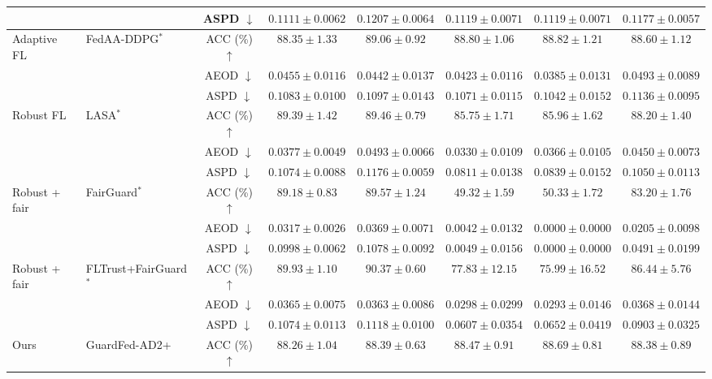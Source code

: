 \begin{table}[t]
{\begin{tabular}{l|l|c|ccccc}
 &  & ASPD $\downarrow$ & $0.1111 \pm 0.0062$ & $0.1207 \pm 0.0064$ & $0.1119 \pm 0.0071$ & $0.1119 \pm 0.0071$ & $0.1177 \pm 0.0057$ \\
\hline
\multirow{3}{*}{Adaptive FL} & \multirow{3}{*}{FedAA-DDPG$^{*}$} & ACC (\%) $\uparrow$ & $88.35 \pm 1.33$ & $89.06 \pm 0.92$ & $88.80 \pm 1.06$ & $88.82 \pm 1.21$ & $88.60 \pm 1.12$ \\
 &  & AEOD $\downarrow$ & $0.0455 \pm 0.0116$ & $0.0442 \pm 0.0137$ & $0.0423 \pm 0.0116$ & $0.0385 \pm 0.0131$ & $0.0493 \pm 0.0089$ \\
 &  & ASPD $\downarrow$ & $0.1083 \pm 0.0100$ & $0.1097 \pm 0.0143$ & $0.1071 \pm 0.0115$ & $0.1042 \pm 0.0152$ & $0.1136 \pm 0.0095$ \\
\hline
\multirow{3}{*}{Robust FL} & \multirow{3}{*}{LASA$^{*}$} & ACC (\%) $\uparrow$ & $89.39 \pm 1.42$ & $89.46 \pm 0.79$ & $85.75 \pm 1.71$ & $85.96 \pm 1.62$ & $88.20 \pm 1.40$ \\
 &  & AEOD $\downarrow$ & $0.0377 \pm 0.0049$ & $0.0493 \pm 0.0066$ & $0.0330 \pm 0.0109$ & $0.0366 \pm 0.0105$ & $0.0450 \pm 0.0073$ \\
 &  & ASPD $\downarrow$ & $0.1074 \pm 0.0088$ & $0.1176 \pm 0.0059$ & $0.0811 \pm 0.0138$ & $0.0839 \pm 0.0152$ & $0.1050 \pm 0.0113$ \\
\hline
\multirow{3}{*}{Robust + fair} & \multirow{3}{*}{FairGuard$^{*}$} & ACC (\%) $\uparrow$ & $89.18 \pm 0.83$ & $89.57 \pm 1.24$ & $49.32 \pm 1.59$ & $50.33 \pm 1.72$ & $83.20 \pm 1.76$ \\
 &  & AEOD $\downarrow$ & $0.0317 \pm 0.0026$ & $0.0369 \pm 0.0071$ & $0.0042 \pm 0.0132$ & $0.0000 \pm 0.0000$ & $0.0205 \pm 0.0098$ \\
 &  & ASPD $\downarrow$ & $0.0998 \pm 0.0062$ & $0.1078 \pm 0.0092$ & $0.0049 \pm 0.0156$ & $0.0000 \pm 0.0000$ & $0.0491 \pm 0.0199$ \\
\hline
\multirow{3}{*}{Robust + fair} & \multirow{3}{*}{FLTrust+FairGuard$^{*}$} & ACC (\%) $\uparrow$ & $89.93 \pm 1.10$ & $90.37 \pm 0.60$ & $77.83 \pm 12.15$ & $75.99 \pm 16.52$ & $86.44 \pm 5.76$ \\
 &  & AEOD $\downarrow$ & $0.0365 \pm 0.0075$ & $0.0363 \pm 0.0086$ & $0.0298 \pm 0.0299$ & $0.0293 \pm 0.0146$ & $0.0368 \pm 0.0144$ \\
 &  & ASPD $\downarrow$ & $0.1074 \pm 0.0113$ & $0.1118 \pm 0.0100$ & $0.0607 \pm 0.0354$ & $0.0652 \pm 0.0419$ & $0.0903 \pm 0.0325$ \\
\hline
\multirow{3}{*}{Ours} & \multirow{3}{*}{GuardFed-AD2+} & ACC (\%) $\uparrow$ & $88.26 \pm 1.04$ & $88.39 \pm 0.63$ & $88.47 \pm 0.91$ & $88.69 \pm 0.81$ & $88.38 \pm 0.89$ \\

\end{tabular}}
\end{table}
